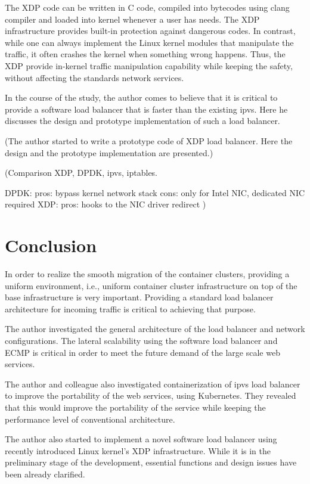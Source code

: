 The XDP code can be written in C code, compiled into bytecodes using clang compiler and loaded into kernel whenever a user has needs.
The XDP infrastructure provides built-in protection against dangerous codes.
In contrast, while one can always implement the Linux kernel modules that manipulate the traffic, it often crashes the kernel when something wrong happens.
Thus, the XDP provide in-kernel traffic manipulation capability while keeping the safety, without affecting the standards network services.

In the course of the study, the author comes to believe that it is critical to provide a software load balancer that is faster than the existing ipvs.
Here he discusses the design and prototype implementation of such a load balancer.





(The author started to write a prototype code of XDP load balancer.
Here the design and the prototype implementation are presented.)

(Comparison XDP, DPDK, ipvs, iptables.

DPDK: pros: bypass kernel network stack cons: only for Intel NIC, dedicated NIC required
XDP: pros: hooks to the NIC driver redirect
)

\section{Conclusion}\label{Conclusion}

In order to realize the smooth migration of the container clusters, providing a uniform environment, i.e., uniform container cluster infrastructure on top of the base infrastructure is very important.
Providing a standard load balancer architecture for incoming traffic is critical to achieving that purpose.

The author investigated the general architecture of the load balancer and network configurations.
The lateral scalability using the software load balancer and ECMP is critical in order to meet the future demand of the large scale web services.

The author and colleague also investigated containerization of ipvs load balancer to improve the portability of the web services, using Kubernetes.
They revealed that this would improve the portability of the service while keeping the performance level of conventional architecture.

The author also started to implement a novel software load balancer using recently introduced Linux kernel's XDP infrastructure. While it is in the preliminary stage of the development, essential functions and design issues have been already clarified.

